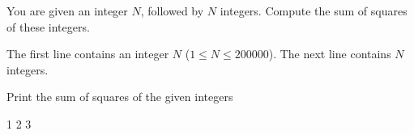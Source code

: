 
You are given an integer $N$, followed by $N$ integers.
Compute the sum of squares of these integers.

\begin{Input}
The first line contains an integer $N$ ($1 \le N \le 200000$).
The next line contains $N$ integers.
\end{Input}

\begin{Output}
Print the sum of squares of the given integers
\end{Output}

\nextsample
{}
1 2 3

\remainingsamples
